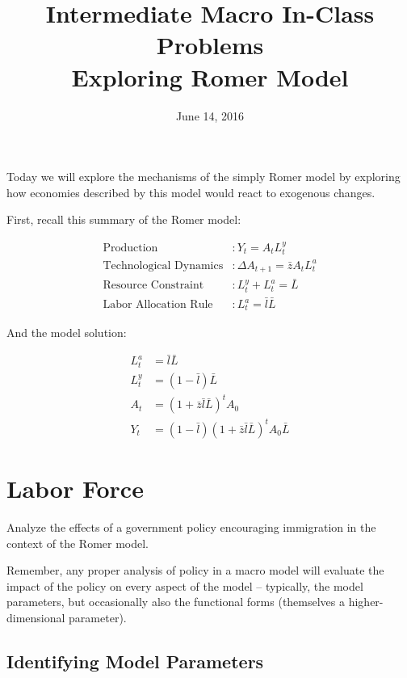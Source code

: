 \documentclass{article}
\begin{document}
\title{Intermediate Macro In-Class Problems \\ \large Exploring Romer Model}

\date{June 14, 2016}

\maketitle

Today we will explore the mechanisms of the simply Romer model by exploring how economies described by this model would react to exogenous changes.

First, recall this summary of the Romer model:

\begin{align*}
\text{Production} &: Y_t = A_t L^y_t \\
\text{Technological Dynamics} &: \Delta A_{t+1} = \bar{z} A_t L^a_t \\
\text{Resource Constraint} &: L^y_t + L^a_t = \bar{L} \\
\text{Labor Allocation Rule} &: L^a_t = \bar{l} \bar{L}
\end{align*}

And the model solution:

\begin{align*}
L^a_t &= \bar{l} \bar{L} \\
L^y_t &= \left(1 - \bar{l} \right) \bar{L} \\
A_t &= \left(1 + \bar{z} \bar{l} \bar{L} \right)^t A_0 \\
Y_t &= \left(1 - \bar{l} \right) \left(1 + \bar{z} \bar{l} \bar{L} \right)^t A_0 \bar{L}
\end{align*}

\section{Labor Force}

Analyze the effects of a government policy encouraging immigration in the context of the Romer model.

Remember, any proper analysis of policy in a macro model will evaluate the impact of the policy on every aspect of the model -- typically, the model parameters, but occasionally also the functional forms (themselves a higher-dimensional parameter).

\subsection*{Identifying Model Parameters}
\end{document}
